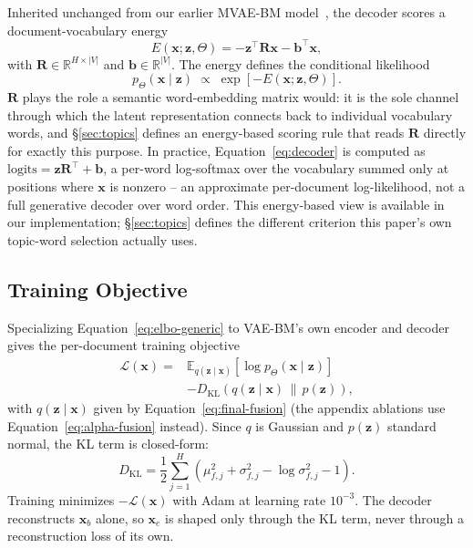 \documentclass[11pt]{article}
\begin{document}
Inherited unchanged from our earlier MVAE-BM model~\citep{gomes2021mvaebm}, the decoder scores a document-vocabulary energy
\begin{equation}
E(\mathbf{x};\mathbf{z},\Theta) = -\mathbf{z}^\top\mathbf{R}\mathbf{x} - \mathbf{b}^\top\mathbf{x},
\label{eq:energy}
\end{equation}
with $\mathbf{R}\in\mathbb{R}^{H\times|V|}$ and $\mathbf{b}\in\mathbb{R}^{|V|}$. The energy defines the conditional likelihood
\begin{equation}
p_\Theta(\mathbf{x}\mid\mathbf{z}) \;\propto\; \exp\!\left[-E(\mathbf{x};\mathbf{z},\Theta)\right].
\label{eq:decoder}
\end{equation}
$\mathbf{R}$ plays the role a semantic word-embedding matrix would: it is the sole channel through which the latent representation connects back to individual vocabulary words, and \S\ref{sec:topics} defines an energy-based scoring rule that reads $\mathbf{R}$ directly for exactly this purpose. In practice, Equation~\ref{eq:decoder} is computed as $\text{logits}=\mathbf{z}\mathbf{R}^\top+\mathbf{b}$, a per-word log-softmax over the vocabulary summed only at positions where $\mathbf{x}$ is nonzero -- an approximate per-document log-likelihood, not a full generative decoder over word order. This energy-based view is available in our implementation; \S\ref{sec:topics} defines the different criterion this paper's own topic-word selection actually uses.

\subsection{Training Objective}
\label{sec:objective}

Specializing Equation~\ref{eq:elbo-generic} to VAE-BM's own encoder and decoder gives the per-document training objective
\begin{equation}
\begin{aligned}
\mathcal{L}(\mathbf{x}) = {} &\mathbb{E}_{q(\mathbf{z}\mid\mathbf{x})}\!\left[\log p_\Theta(\mathbf{x}\mid\mathbf{z})\right] \\
&- D_{\mathrm{KL}}\!\left(q(\mathbf{z}\mid\mathbf{x})\,\|\,p(\mathbf{z})\right),
\end{aligned}
\label{eq:elbo}
\end{equation}
with $q(\mathbf{z}\mid\mathbf{x})$ given by Equation~\ref{eq:final-fusion} (the appendix ablations use Equation~\ref{eq:alpha-fusion} instead). Since $q$ is Gaussian and $p(\mathbf{z})$ standard normal, the KL term is closed-form:
\begin{equation}
D_{\mathrm{KL}} = \frac{1}{2}\sum_{j=1}^{H}\left(\mu_{f,j}^2+\sigma_{f,j}^2-\log\sigma_{f,j}^2-1\right).
\label{eq:kl}
\end{equation}
Training minimizes $-\mathcal{L}(\mathbf{x})$ with Adam at learning rate $10^{-3}$. The decoder reconstructs $\mathbf{x}_b$ alone, so $\mathbf{x}_e$ is shaped only through the KL term, never through a reconstruction loss of its own.
\end{document}

